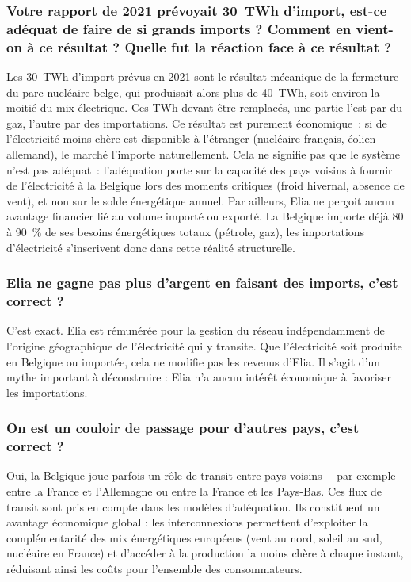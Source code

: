 \subsubsection{Votre rapport de 2021 prévoyait 30~TWh d'import, est-ce adéquat de faire de si grands imports ? Comment en vient-on à ce résultat ? Quelle fut la réaction face à ce résultat ?}

Les 30~TWh d'import prévus en 2021 sont le résultat mécanique de la fermeture du parc nucléaire belge, qui produisait alors plus de 40~TWh, soit environ la moitié du mix électrique. Ces TWh devant être remplacés, une partie l'est par du gaz, l'autre par des importations. Ce résultat est purement économique~: si de l'électricité moins chère est disponible à l'étranger (nucléaire français, éolien allemand), le marché l'importe naturellement. Cela ne signifie pas que le système n'est pas adéquat~: l'adéquation porte sur la capacité des pays voisins à fournir de l'électricité à la Belgique lors des moments critiques (froid hivernal, absence de vent), et non sur le solde énergétique annuel. Par ailleurs, Elia ne perçoit aucun avantage financier lié au volume importé ou exporté. La Belgique importe déjà 80 à 90~\% de ses besoins énergétiques totaux (pétrole, gaz), les importations d'électricité s'inscrivent donc dans cette réalité structurelle.

\subsubsection{Elia ne gagne pas plus d'argent en faisant des imports, c'est correct ?}

C'est exact. Elia est rémunérée pour la gestion du réseau indépendamment de l'origine géographique de l'électricité qui y transite. Que l'électricité soit produite en Belgique ou importée, cela ne modifie pas les revenus d'Elia. Il s'agit d'un mythe important à déconstruire : Elia n'a aucun intérêt économique à favoriser les importations.

\subsubsection{On est un couloir de passage pour d'autres pays, c'est correct ?}

Oui, la Belgique joue parfois un rôle de transit entre pays voisins~-- par exemple entre la France et l'Allemagne ou entre la France et les Pays-Bas. Ces flux de transit sont pris en compte dans les modèles d'adéquation. Ils constituent un avantage économique global : les interconnexions permettent d'exploiter la complémentarité des mix énergétiques européens (vent au nord, soleil au sud, nucléaire en France) et d'accéder à la production la moins chère à chaque instant, réduisant ainsi les coûts pour l'ensemble des consommateurs.

